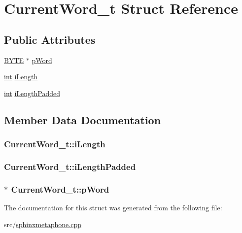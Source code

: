 \hypertarget{structCurrentWord__t}{\section{Current\-Word\-\_\-t Struct Reference}
\label{structCurrentWord__t}
}
\subsection*{Public Attributes}
\begin{DoxyCompactItemize}
\item 
\hyperlink{sphinxstd_8h_a4ae1dab0fb4b072a66584546209e7d58}{B\-Y\-T\-E} $\ast$ \hyperlink{structCurrentWord__t_ae155747f8d512c5b0aa1d4eb443727a9}{p\-Word}
\item 
\hyperlink{sphinxexpr_8cpp_a4a26e8f9cb8b736e0c4cbf4d16de985e}{int} \hyperlink{structCurrentWord__t_a65ee15b65d770a2d31ce317f64acbbd3}{i\-Length}
\item 
\hyperlink{sphinxexpr_8cpp_a4a26e8f9cb8b736e0c4cbf4d16de985e}{int} \hyperlink{structCurrentWord__t_a811616d07316babfb3e71cbc1799feb3}{i\-Length\-Padded}
\end{DoxyCompactItemize}


\subsection{Member Data Documentation}
\hypertarget{structCurrentWord__t_a65ee15b65d770a2d31ce317f64acbbd3}{
\subsubsection[{i\-Length}]{ Current\-Word\-\_\-t\-::i\-Length}}\label{structCurrentWord__t_a65ee15b65d770a2d31ce317f64acbbd3}
\hypertarget{structCurrentWord__t_a811616d07316babfb3e71cbc1799feb3}{
\subsubsection[{i\-Length\-Padded}]{ Current\-Word\-\_\-t\-::i\-Length\-Padded}}\label{structCurrentWord__t_a811616d07316babfb3e71cbc1799feb3}
\hypertarget{structCurrentWord__t_ae155747f8d512c5b0aa1d4eb443727a9}{
\subsubsection[{p\-Word}]{$\ast$ Current\-Word\-\_\-t\-::p\-Word}}\label{structCurrentWord__t_ae155747f8d512c5b0aa1d4eb443727a9}


The documentation for this struct was generated from the following file\-:\begin{DoxyCompactItemize}
\item 
src/\hyperlink{sphinxmetaphone_8cpp}{sphinxmetaphone.\-cpp}\end{DoxyCompactItemize}
